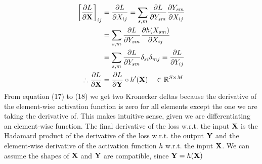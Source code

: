 \documentclass[a4paper]{article}
\begin{document}
\subsection{} %
\begin{align}
   \left[ \frac{\partial L}{\partial \mathbf{X}} \right]_{ij} &= \frac{\partial L}{\partial X_{ij}} = \sum_{s,m} \frac{\partial L}{\partial Y_{sm}} \frac{\partial Y_{sm}}{\partial X_{ij}} \\
   &= \sum_{s,m} \frac{\partial L}{\partial Y_{sm}} \frac{\partial h(X_{sm})}{\partial X_{ij}} \\
   &= \sum_{s,m} \frac{\partial L}{\partial Y_{sm}} \delta_{si} \delta_{mj} = \frac{\partial L}{\partial Y_{ij}} \\
   \therefore \frac{\partial L}{\partial \mathbf{X}} &= \frac{\partial L}{\partial \mathbf{Y}} \circ h'(\mathbf{X}) \quad \in \mathbb{R}^{S \times M}
\end{align}
From equation (17) to (18) we get two Kronecker deltas because the derivative of the element-wise activation function
is zero for all elements except the one we are taking the derivative of. This makes intuitive sense, given we are
differentiating an element-wise function. The final derivative of the loss w.r.t. the input $\mathbf{X}$ is the Hadamard
product of the derivative of the loss w.r.t. the output $\mathbf{Y}$ and the element-wise derivative of the activation
function $h$ w.r.t. the input $\mathbf{X}$. We can assume the shapes of $\mathbf{X}$ and $\mathbf{Y}$ are compatible, since $\mathbf{Y}=h(\mathbf{X})$
\end{document}
